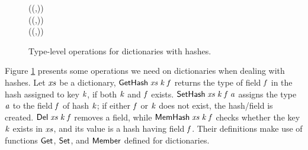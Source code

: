 \begin{figure}[t]
\begin{hscode}
\>[B]{}\<[5]%
\>[5]{}\;(\mbox{\textquotesingle}(,\;){}\<[36]%
\>[36]{}\mathbin{\mbox{\textquotesingle}\!:})\;{}\<[45]%
\>[45]{}\;\mathrel{=}\;\;\<[E]%
\\
\>[B]{}\<[5]%
\>[5]{}\;(\mbox{\textquotesingle}(,){}\<[36]%
\>[36]{}\mathbin{\mbox{\textquotesingle}\!:})\;{}\<[45]%
\>[45]{}\;\mathrel{=}\mbox{\textquotesingle}\<[E]%
\\
\>[B]{}\<[5]%
\>[5]{}\;(\mbox{\textquotesingle}(,){}\<[36]%
\>[36]{}\mathbin{\mbox{\textquotesingle}\!:})\;{}\<[45]%
\>[45]{}\;\mathrel{=}\;\;\;\<[E]%
\ColumnHook
\end{hscode}\resethooks
\caption{Type-level operations for dictionaries with hashes.}
\label{fig:xxxHash}
\end{figure}

Figure \ref{fig:xxxHash} presents some operations we need on dictionaries when
dealing with hashes. Let \ensuremath{\Varid{xs}} be a dictionary, \ensuremath{\Conid{GetHash}\;\Varid{xs}\;\Varid{k}\;\Varid{f}} returns the type
of field \ensuremath{\Varid{f}} in the hash assigned to key \ensuremath{\Varid{k}}, if both \ensuremath{\Varid{k}} and \ensuremath{\Varid{f}} exists.
\ensuremath{\Conid{SetHash}\;\Varid{xs}\;\Varid{k}\;\Varid{f}\;\Varid{a}} assigns the type \ensuremath{\Varid{a}} to the field \ensuremath{\Varid{f}} of hash \ensuremath{\Varid{k}}; if either
\ensuremath{\Varid{f}} or \ensuremath{\Varid{k}} does not exist, the hash/field is created. \ensuremath{\Conid{Del}\;\Varid{xs}\;\Varid{k}\;\Varid{f}} removes a
field, while \ensuremath{\Conid{MemHash}\;\Varid{xs}\;\Varid{k}\;\Varid{f}} checks whether the key \ensuremath{\Varid{k}} exists in \ensuremath{\Varid{xs}}, and its
value is a hash having field \ensuremath{\Varid{f}}. Their definitions make use of functions \ensuremath{\Conid{Get}},
\ensuremath{\Conid{Set}}, and \ensuremath{\Conid{Member}} defined for dictionaries.

